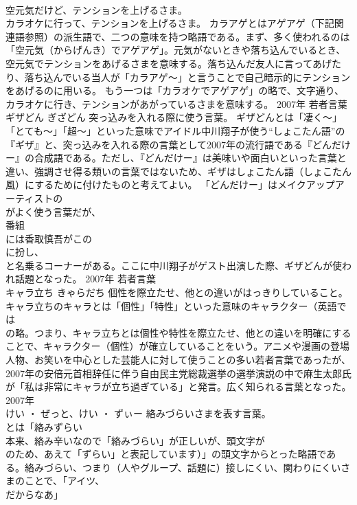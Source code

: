 \documentclass[8pt]{extreport}
\begin{document}
\begin{CJK}{UTF8}{min}
\\	空元気だけど、テンションを上げるさま。 
\\	カラオケに行って、テンションを上げるさま。	カラアゲとはアゲアゲ（下記関連語参照）の派生語で、二つの意味を持つ略語である。まず、多く使われるのは「空元気（からげんき）でアゲアゲ」。元気がないときや落ち込んでいるとき、空元気でテンションをあげるさまを意味する。落ち込んだ友人に言ってあげたり、落ち込んでいる当人が「カラアゲ～」と言うことで自己暗示的にテンションをあげるのに用いる。 もう一つは「カラオケでアゲアゲ」の略で、文字通り、カラオケに行き、テンションがあがっているさまを意味する。	2007年	若者言葉	
\\	ギザどん	ぎざどん	突っ込みを入れる際に使う言葉。	ギザどんとは「凄く～」「とても～」「超～」といった意味でアイドル中川翔子が使う“しょこたん語”の『ギザ』と、突っ込みを入れる際の言葉として2007年の流行語である『どんだけー』の合成語である。ただし、『どんだけー』は美味いや面白いといった言葉と違い、強調させ得る類いの言葉ではないため、ギザはしょこたん語（しょこたん風）にするために付けたものと考えてよい。 「どんだけー」はメイクアップアーティストの
\\	がよく使う言葉だが、
\\	番組
\\	には香取慎吾がこの
\\	に扮し、
\\	と名乗るコーナーがある。ここに中川翔子がゲスト出演した際、ギザどんが使われ話題となった。	2007年	若者言葉	
\\	キャラ立ち	きゃらだち	個性を際立たせ、他との違いがはっきりしていること。	キャラ立ちのキャラとは「個性」「特性」といった意味のキャラクター（英語では
\\	の略。つまり、キャラ立ちとは個性や特性を際立たせ、他との違いを明確にすることで、キャラクター（個性）が確立していることをいう。アニメや漫画の登場人物、お笑いを中心とした芸能人に対して使うことの多い若者言葉であったが、2007年の安倍元首相辞任に伴う自由民主党総裁選挙の選挙演説の中で麻生太郎氏が「私は非常にキャラが立ち過ぎている」と発言。広く知られる言葉となった。	2007年	
\\	けい ・ ぜっと、けい ・ ずぃー	絡みづらいさまを表す言葉。	
\\	とは「絡みずらい
\\	本来、絡み辛いなので「絡みづらい」が正しいが、頭文字が
\\	のため、あえて「ずらい」と表記しています）」の頭文字からとった略語である。絡みづらい、つまり（人やグループ、話題に）接しにくい、関わりにくいさまのことで、「アイツ、
\\	だからなあ」

\end{CJK}
\end{document}

